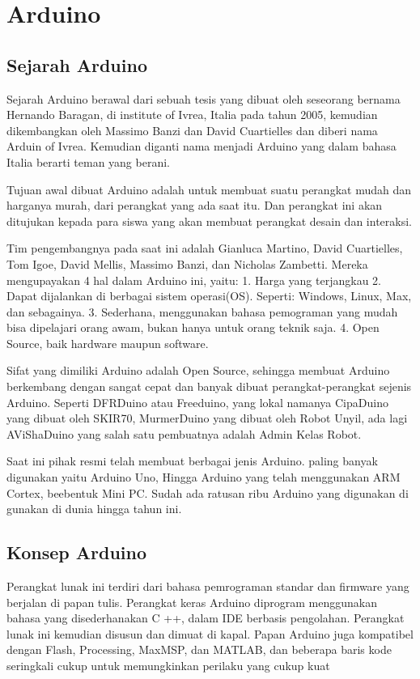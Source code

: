 \section{Arduino}
\subsection{Sejarah Arduino}
	Sejarah Arduino berawal dari sebuah tesis yang dibuat oleh seseorang bernama Hernando Baragan, di institute of Ivrea, Italia pada tahun 2005, kemudian dikembangkan oleh Massimo Banzi dan David Cuartielles dan diberi nama Arduin of Ivrea. Kemudian diganti nama menjadi Arduino yang dalam bahasa Italia berarti teman yang berani.

	Tujuan awal dibuat Arduino adalah untuk membuat suatu perangkat mudah dan harganya murah, dari perangkat yang ada saat itu. Dan perangkat ini akan ditujukan kepada para siswa yang akan membuat perangkat desain dan interaksi.

	Tim pengembangnya pada saat ini adalah Gianluca Martino, David Cuartielles, Tom Igoe, David Mellis, Massimo Banzi, dan Nicholas Zambetti. Mereka mengupayakan 4 hal dalam Arduino ini, yaitu:
	1.	Harga yang terjangkau
	2.	Dapat dijalankan di berbagai sistem operasi(OS). Seperti: Windows, Linux, Max, dan sebagainya.
	3.	Sederhana, menggunakan bahasa pemograman yang mudah bisa dipelajari orang awam, bukan hanya untuk orang teknik saja.
	4.	Open Source, baik hardware maupun software.

	Sifat yang dimiliki Arduino adalah Open Source, sehingga membuat Arduino berkembang dengan sangat cepat dan banyak dibuat perangkat-perangkat sejenis Arduino. Seperti DFRDuino atau Freeduino,  yang lokal namanya CipaDuino yang dibuat oleh SKIR70, MurmerDuino yang dibuat oleh Robot Unyil, ada lagi AViShaDuino yang salah satu pembuatnya adalah Admin Kelas Robot.
	
	Saat ini pihak resmi telah membuat berbagai jenis Arduino.  paling banyak digunakan yaitu Arduino Uno, Hingga Arduino yang telah menggunakan ARM Cortex, beebentuk Mini PC. Sudah ada ratusan ribu Arduino yang digunakan di gunakan di dunia hingga tahun ini. 

\subsection{Konsep Arduino}
	Perangkat lunak ini terdiri dari bahasa pemrograman standar dan firmware yang berjalan di papan tulis. Perangkat keras Arduino diprogram menggunakan bahasa yang disederhanakan C ++, dalam IDE berbasis pengolahan. Perangkat lunak ini kemudian disusun dan dimuat di kapal. Papan Arduino juga kompatibel dengan Flash, Processing, MaxMSP, dan MATLAB, dan beberapa baris kode seringkali cukup untuk memungkinkan perilaku yang cukup kuat

